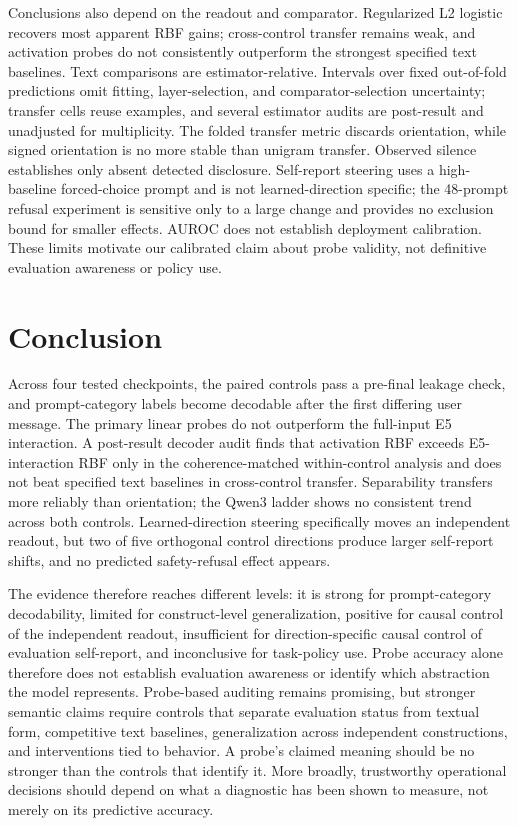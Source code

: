 \documentclass{article}
\begin{document}
Conclusions also depend on the readout and comparator. Regularized L2 logistic
recovers most apparent RBF gains; cross-control transfer remains weak, and
activation probes do not consistently outperform the strongest specified text
baselines. Text comparisons are estimator-relative. Intervals over fixed
out-of-fold predictions omit fitting, layer-selection, and comparator-selection
uncertainty; transfer cells reuse examples, and several estimator audits are
post-result and unadjusted for multiplicity. The folded transfer metric discards
orientation, while signed orientation is no more stable than unigram transfer.
Observed silence establishes only absent detected disclosure. Self-report
steering uses a high-baseline forced-choice prompt and is not learned-direction
specific; the 48-prompt refusal experiment is sensitive only to a large change
and provides no exclusion bound for smaller effects. AUROC does not establish
deployment calibration. These limits motivate our calibrated claim about probe
validity, not definitive evaluation awareness or policy use.

\section{Conclusion}

Across four tested checkpoints, the paired controls pass a pre-final
leakage check, and prompt-category labels become decodable after the first
differing user message. The primary linear probes do not outperform the
full-input E5 interaction. A post-result decoder audit finds that activation RBF
exceeds E5-interaction RBF only in the coherence-matched within-control analysis
and does not beat specified text baselines in cross-control transfer.
Separability transfers more reliably than orientation; the Qwen3 ladder shows
no consistent trend across both controls.
Learned-direction steering specifically moves an independent readout, but two
of five orthogonal control directions produce larger self-report shifts, and no
predicted safety-refusal effect appears.

The evidence therefore reaches different levels: it is strong for
prompt-category decodability, limited for construct-level generalization,
positive for causal control of the independent readout, insufficient for
direction-specific causal control of evaluation self-report, and inconclusive
for task-policy use. Probe accuracy alone therefore does not establish
evaluation awareness or identify which abstraction the model represents. Probe-based auditing
remains promising, but stronger semantic claims require
controls that separate evaluation status from textual form, competitive text
baselines, generalization across independent constructions, and interventions
tied to behavior. A probe's claimed meaning should be no stronger than the
controls that identify it. More broadly, trustworthy operational decisions
should depend on what a diagnostic has been shown to measure, not merely on its
predictive accuracy.
\end{document}
